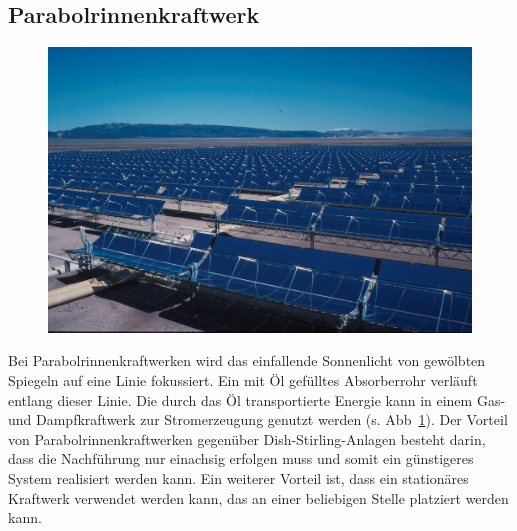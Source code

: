 \documentclass[fontsize=10pt,paper=a4,bibliography=totoc]{scrartcl}
\begin{document}
\subsection{Parabolrinnenkraftwerk}
\begin{figure}[htb]
	\centering
	\def\svgwidth{.6\textwidth}
	\includegraphics[width=\textwidth]{Solar_Plant_kl}
	\label{pic:parabolrinnen}
\end{figure}
Bei Parabolrinnenkraftwerken wird das einfallende Sonnenlicht von gewölbten Spiegeln auf eine Linie fokussiert. Ein mit Öl gefülltes Absorberrohr verläuft entlang dieser Linie. Die durch das Öl transportierte Energie kann in einem Gas- und Dampfkraftwerk zur Stromerzeugung genutzt werden (s. Abb~\ref{pic:parabolrinnen}). Der Vorteil von Parabolrinnenkraftwerken gegenüber Dish-Stirling-Anlagen besteht darin, dass die Nachführung nur einachsig erfolgen muss und somit ein günstigeres System realisiert werden kann. Ein weiterer Vorteil ist, dass ein stationäres Kraftwerk verwendet werden kann, das an einer beliebigen Stelle platziert werden kann. 
\end{document}

